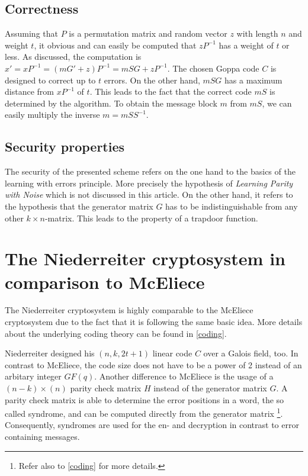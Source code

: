 \subsection*{Correctness}
Assuming that $P$ is a permutation matrix and random vector $z$ with length $n$ and weight $t$, it obvious and can easily be computed that $zP^{-1}$ has a weight of $t$ or less.
As discussed, the computation is $x' = x P^{-1} = (mG'+z)P^{-1} = mSG + z P^{-1}$.
The chosen Goppa code $C$ is designed to correct up to $t$ errors. On the other hand, $mSG$ has a maximum distance from $xP^{-1}$ of $t$. This leads to the fact that the correct code $mS$ is determined by the algorithm. 
To obtain the message block $m$ from $mS$, we can easily multiply the inverse $m = mSS^{-1}$\cite{wiki:mcelice}.

\subsection*{Security properties}
The security of the presented scheme refers on the one hand to the basics of the learning with errors principle. More precisely the hypothesis of \textit{Learning Parity with Noise}\cite{pietrzak2012cryptography} which is not discussed in this article. 
On the other hand, it refers to the hypothesis that the generator matrix $G$ has to be indistinguishable from any other $k \times n$-matrix. This leads to the property of a trapdoor function.


\section{The Niederreiter cryptosystem in comparison to McEliece}
\label{niederreither}
The Niederreiter cryptosystem is highly comparable to the McEliece cryptosystem due to the fact that it is following the same basic idea. More details about the underlying coding theory can be found in \autoref{coding}.

Niederreiter designed his $(n, k, 2t + 1)$ linear code $C$ over a Galois field, too. In contrast to McEliece, the code size does not have to be a power of 2 instead of an arbitary integer $GF(q)$. Another difference to McEliece is the usage of a $(n - k) \times (n)$ parity check matrix $H$ instead of the generator matrix $G$. A parity check matrix is able to determine the error positions in a word, the so called syndrome, and can be computed directly from the generator matrix \footnote{Refer also to \ref{coding} for more details.}. Consequently, syndromes are used for the en- and decryption in contrast to error containing messages. 

